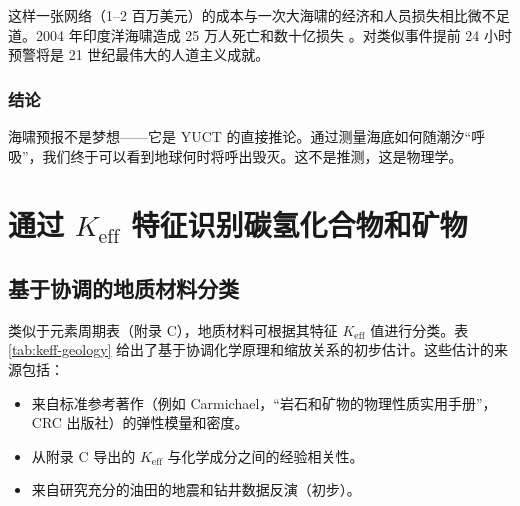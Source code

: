 \documentclass[12pt,a4paper]{article}
\theoremstyle{remark}
\newcommand{\Keff}{K_{\mathrm{eff}}}
\begin{document}
	这样一张网络（1–2 百万美元）的成本与一次大海啸的经济和人员损失相比微不足道。2004 年印度洋海啸造成 25 万人死亡和数十亿损失 \cite{NOAA2024, USGS2024}。对类似事件提前 24 小时预警将是 21 世纪最伟大的人道主义成就。
	
	\subsubsection{结论}
	
	海啸预报不是梦想——它是 YUCT 的直接推论。通过测量海底如何随潮汐“呼吸”\cite{Tolstoy2013}，我们终于可以看到地球何时将呼出毁灭。这不是推测，这是物理学。
	
	\section{通过 $\Keff$ 特征识别碳氢化合物和矿物}
	\label{sec:identification}
	
	\subsection{基于协调的地质材料分类}
	
	类似于元素周期表（附录 C），地质材料可根据其特征 $\Keff$ 值进行分类。表 \ref{tab:keff-geology} 给出了基于协调化学原理和缩放关系的初步估计。这些估计的来源包括：
	\begin{itemize}
		\item 来自标准参考著作（例如 Carmichael，“岩石和矿物的物理性质实用手册”，CRC 出版社）的弹性模量和密度。
		\item 从附录 C 导出的 $\Keff$ 与化学成分之间的经验相关性。
		\item 来自研究充分的油田的地震和钻井数据反演（初步）。
	\end{itemize}
	
\end{document}
